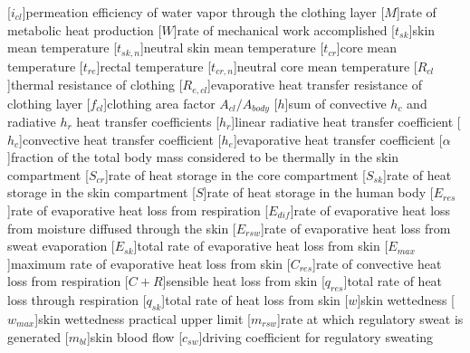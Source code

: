 \begin{acronym}[longest]
        [$i_{cl}$]{permeation efficiency of water vapor through the clothing layer}
    [$M$]{rate of metabolic heat production}
    [$W$]{rate of mechanical work accomplished}
    [$t_{sk}$]{skin mean temperature}
    [$t_{sk,n}$]{neutral skin mean temperature}
    [$t_{cr}$]{core mean temperature}
    [$t_{re}$]{rectal temperature}
    [$t_{cr,n}$]{neutral core mean temperature}
    [$R_{cl}$]{thermal resistance of clothing}
    [$R_{e,cl}$]{evaporative heat transfer resistance of clothing layer}
    [$f_{cl}$]{clothing area factor $A_{cl}/A_{body}$}
    [$h$]{sum of convective $h_{c}$ and radiative $h_{r}$ heat transfer coefficients}
    [$h_{r}$]{linear radiative heat transfer coefficient}
    [$h_{c}$]{convective heat transfer coefficient}
    [$h_{e}$]{evaporative heat transfer coefficient}
    [$\alpha$]{fraction of the total body mass considered
to be thermally in the skin compartment}
        [$S_{cr}$]{rate of heat storage in the core compartment}
    [$S_{sk}$]{rate of heat storage in the skin compartment}
    [$S$]{rate of heat storage in the human body}
    [$E_{res}$]{rate of evaporative heat loss from respiration}
    [$E_{dif}$]{rate of evaporative heat loss from moisture diffused through the skin}
    [$E_{rsw}$]{rate of evaporative heat loss from sweat evaporation}
    [$E_{sk}$]{total rate of evaporative heat loss from skin}
    [$E_{max}$]{maximum rate of evaporative heat loss from skin}
    [$C_{res}$]{rate of convective heat loss from respiration}
    [$C + R$]{sensible heat loss from skin}
    [$q_{res}$]{total rate of heat loss through respiration}
    [$q_{sk}$]{total rate of heat loss from skin}
    [$w$]{skin wettedness}
    [$w_{max}$]{skin wettedness practical upper limit}
    [$m_{rsw}$]{rate at which regulatory sweat is generated}
    [$m_{bl}$]{skin blood flow}
    [$c_{sw}$]{driving coefficient for regulatory sweating}

\end{acronym}
\renewcommand{\baselinestretch}{1}\normalsize
